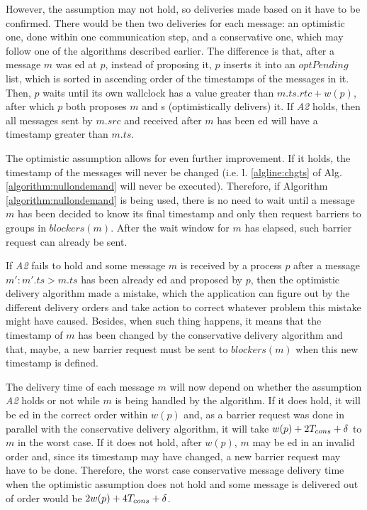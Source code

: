 \documentclass[times, 10pt]{article}
\begin{document}
However, the assumption may not hold, so deliveries made based on it have to be confirmed. There would be then two deliveries for each message: an optimistic one, done within one communication step, and a conservative one, which may follow one of the algorithms described earlier. The difference is that, after a message $m$ was \rmd{}ed at $p$, instead of proposing it, $p$ inserts it into an $optPending$ list, which is sorted in ascending order of the timestamps of the messages in it. Then, $p$ waits until its own wallclock has a value greater than $m.ts.rtc + w(p)$, after which $p$ both proposes $m$ and \opt{}s (optimistically delivers) it. If \emph{A2} holds, then all messages sent by $m.src$ and received after $m$ has been \opt{}ed will have a timestamp greater than $m.ts$.

The optimistic assumption allows for even further improvement. If it holds, the timestamp of the messages will never be changed (i.e. l. \ref{algline:chgts} of Alg. \ref{algorithm:nullondemand} will never be executed). Therefore, if Algorithm \ref{algorithm:nullondemand} is being used, there is no need to wait until a message $m$ has been decided to know its final timestamp and only then request barriers to groups in $blockers(m)$. After the wait window for $m$ has elapsed, such barrier request can already be sent.

If \emph{A2} fails to hold and some message $m$ is received by a process $p$ after a message \mbox{$m' : m'.ts > m.ts$} has been already \opt{}ed and proposed by $p$, then the optimistic delivery algorithm made a mistake, which the application can figure out by the different delivery orders and take action to correct whatever problem this mistake might have caused. Besides, when such thing happens, it means that the timestamp of $m$ has been changed by the conservative delivery algorithm and that, maybe, a new barrier request must be sent to $blockers(m)$ when this new timestamp is defined.

The delivery time of each message $m$ will now depend on whether the assumption \emph{A2} holds or not while $m$ is being handled by the algorithm. If it does hold, it will be \opt{}ed in the correct order within $w(p)$ and, as a barrier request was done in parallel with the conservative delivery algorithm, it will take $w(p) + 2T_{cons} + \delta$ to \cons{} $m$ in the worst case. If it does not hold, after $w(p)$, $m$ may be \opt{}ed in an invalid order and, since its timestamp may have changed, a new barrier request may have to be done. Therefore, the worst case conservative message delivery time when the optimistic assumption does not hold and some message is delivered out of order would be $2w(p) + 4T_{cons} + \delta$.
\end{document}
